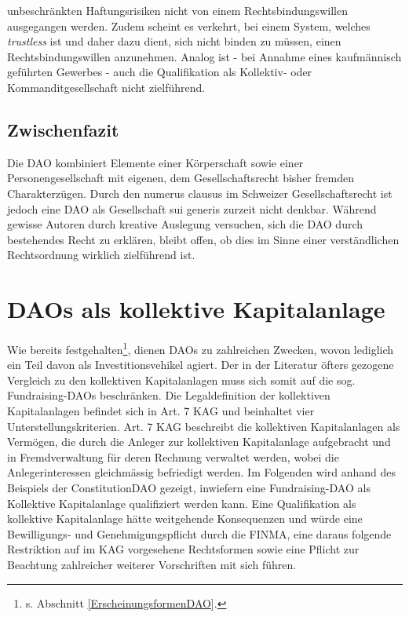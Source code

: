 \documentclass[a4paper,12pt]{report}
\begin{document}
unbeschränkten Haftungsrisiken nicht von einem Rechtsbindungswillen ausgegangen werden. Zudem scheint es verkehrt, bei einem System, welches \textit{trustless} ist und daher dazu dient, sich nicht binden zu müssen, einen Rechtsbindungswillen anzunehmen. Analog ist - bei Annahme eines kaufmännisch geführten Gewerbes - auch die Qualifikation als Kollektiv- oder Kommanditgesellschaft nicht zielführend.
	
	\closesection
	\subsection{Zwischenfazit}
	\startsubsection
	Die DAO kombiniert Elemente einer Körperschaft sowie einer Personengesellschaft mit eigenen, dem Gesellschaftsrecht bisher fremden Charakterzügen. Durch den numerus clausus im Schweizer Gesellschaftsrecht ist jedoch eine DAO als Gesellschaft sui generis zurzeit nicht denkbar. Während gewisse Autoren durch kreative Auslegung versuchen, sich die DAO durch bestehendes Recht zu erklären, bleibt offen, ob dies im Sinne einer verständlichen Rechtsordnung wirklich zielführend ist. 
    \closesection
    \closesection
	
	\section{DAOs als kollektive Kapitalanlage}
	\startsection
	Wie bereits festgehalten\footnote{\space\hspace{0.5em}s. Abschnitt \ref{ErscheinungsformenDAO}.}, dienen DAOs zu zahlreichen Zwecken, wovon lediglich ein Teil davon als Investitionsvehikel agiert. Der in der Literatur öfters gezogene Vergleich zu den kollektiven Kapitalanlagen muss sich somit auf die sog. Fundraising-DAOs beschränken. Die Legaldefinition der kollektiven Kapitalanlagen befindet sich in Art. 7 KAG und beinhaltet vier Unterstellungskriterien. Art. 7 KAG beschreibt die kollektiven Kapitalanlagen als Vermögen, die durch die Anleger zur kollektiven Kapitalanlage aufgebracht und in Fremdverwaltung für deren Rechnung verwaltet werden, wobei die Anlegerinteressen gleichmässig befriedigt werden. Im Folgenden wird anhand des Beispiels der ConstitutionDAO gezeigt, inwiefern eine Fundraising-DAO als Kollektive Kapitalanlage qualifiziert werden kann. Eine Qualifikation als kollektive Kapitalanlage hätte weitgehende Konsequenzen und würde eine Bewilligungs- und Genehmigungspflicht durch die FINMA, eine daraus folgende Restriktion auf im KAG vorgesehene Rechtsformen sowie eine Pflicht zur Beachtung zahlreicher weiterer Vorschriften mit sich führen.
\end{document}

